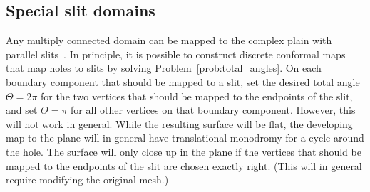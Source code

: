 \documentclass[Thesis]{subfiles}
\begin{document}
\subsection{Special slit domains}

Any multiply connected domain can be mapped to the complex plain with
parallel slits~\cite{nehari1952conformal}. In principle, it is
possible to construct discrete conformal maps that map holes to slits
by solving Problem~\ref{prob:total_angles}. On each boundary component
that should be mapped to a slit, set the desired total angle
$\Theta=2\pi$ for the two vertices that should be mapped to the
endpoints of the slit, and set $\Theta=\pi$ for all other vertices on
that boundary component. However, this will not work in general. While
the resulting surface will be flat, the developing map to the plane
will in general have translational monodromy for a cycle around the
hole. The surface will only close up in the plane if the vertices that
should be mapped to the endpoints of the slit are chosen exactly
right. (This will in general require modifying the original mesh.)
\end{document}
